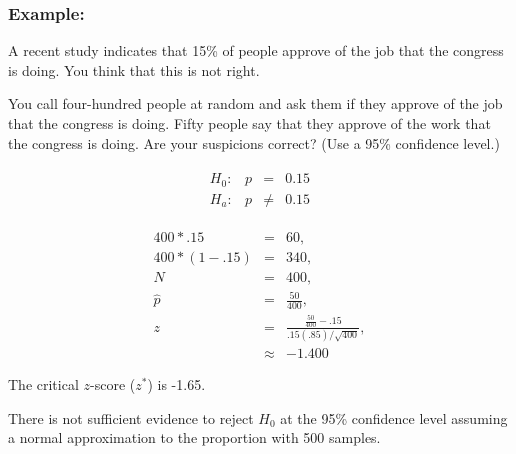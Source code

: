 \begin{frame}
  \frametitle{Example: }

  \vspace*{-2em}
  A recent study indicates that 15\% of people approve of the job that
  the congress is doing. You think that this is not right. 

  You call four-hundred people at random and ask them if they approve
  of the job that the congress is doing. Fifty people say that they
  approve of the work that the congress is doing. Are your suspicions
  correct?  (Use a 95\% confidence level.)

  {
    \begin{eqnarray*}
      \begin{array}{lrcl}
        H_0: & p & = & 0.15 \\
        H_a: & p & \neq & 0.15
      \end{array}
    \end{eqnarray*}
  }

  {
    \begin{eqnarray*}
      400*.15     & = & 60, \\
      400*(1-.15) & = & 340, \\
      N & = & 400, \\
      \hat{p} & = & \frac{50}{400}, \\
      z & = & \frac{\frac{50}{400}-.15}{.15(.85)/\sqrt{400}}, \\
      & \approx & -1.400
    \end{eqnarray*}
  }
  

  {
    The critical $z$-score ($z^*$) is -1.65.
  }

  {

    {\color{red} 

      There is not sufficient evidence to reject $H_0$ at the 95\%
      confidence level assuming a normal approximation to the
      proportion with 500 samples.  

    }

  }


  
\end{frame}





